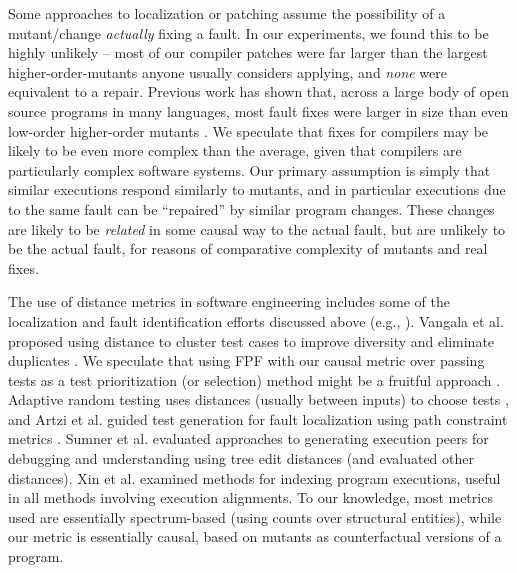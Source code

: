 Some approaches to localization or patching assume the possibility of a mutant/change \emph{actually} fixing a fault.  In our experiments, we found this to be highly unlikely -- most of our compiler patches were far larger than the largest higher-order-mutants \cite{jia2009higher} anyone usually considers applying, and \emph{none} were equivalent to a repair.  Previous work has shown that, across a large body of open source programs in many languages, most fault fixes were larger in size than even low-order higher-order mutants \cite{GopinathMutants}.
We speculate that fixes for compilers may be likely to be even more complex than the average, given that compilers are particularly complex software systems.  
Our primary assumption is simply that similar executions respond similarly to mutants, and in particular executions due to the same fault can be ``repaired'' by similar program changes.  These changes are likely to be \emph{related} in some causal way to the actual fault, but are unlikely to be the actual fault, for reasons of comparative complexity of mutants and real fixes.

The use of distance metrics in software engineering includes some of the localization and fault identification efforts discussed above (e.g., \cite{NearNeighbor,GroceError,ChakiLev,Liu06}).  Vangala et al. proposed using distance to cluster test cases to improve diversity and eliminate duplicates \cite{VangalaDist}.  We speculate that using FPF with our causal metric over passing tests as a test prioritization (or selection) method might be a fruitful approach \cite{YooHarman}.  Adaptive random testing uses distances (usually between inputs) to choose tests \cite{Chen,ARTChen,ISSTAART}, and Artzi et al. guided test generation for fault localization using path constraint metrics \cite{ArtziDirected}.  Sumner et al. evaluated approaches to generating execution peers for debugging and understanding \cite{Sumner2011} using tree edit distances (and evaluated other distances).  Xin et al. \cite{Xin2008} examined methods for indexing program executions, useful in all methods involving execution alignments.  To our knowledge, most metrics used are essentially spectrum-based \cite{RepsSpectra,BallConcept} (using counts over structural entities), while our metric is essentially causal, based on mutants as counterfactual \cite{LewisCause,LewisCount} versions of a program.